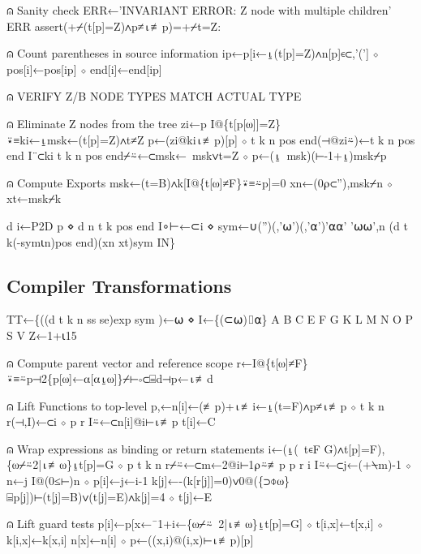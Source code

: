 \documentclass{article}%
\begin{document}
⍝ Sanity check
   ERR←'INVARIANT ERROR: Z node with multiple children'
   ERR assert(+⌿(t[p]=Z)∧p≠⍳≢p)=+⌿t=Z:

⍝ Count parentheses in source information
   ip←p[i←⍸(t[p]=Z)∧n[p]∊⊂,'('] ⋄ pos[i]←pos[ip] ⋄ end[i]←end[ip]

⍝ VERIFY Z/B NODE TYPES MATCH ACTUAL TYPE

⍝ Eliminate Z nodes from the tree
   zi←p I@\{t[p[⍵]]=Z\}⍣≡ki←⍸msk←(t[p]=Z)∧t≠Z
   p←(zi@ki⍳≢p)[p] ⋄ t k n pos end(⊣@zi⍨)←t k n pos end I¨⊂ki
   t k n pos end⌿⍨←⊂msk←~msk∨t=Z ⋄ p←(⍸~msk)(⊢-1+⍸)msk⌿p

⍝ Compute Exports
   msk←(t=B)∧k[I@\{t[⍵]≠F\}⍣≡⍨p]=0
   xn←(0⍴⊂''),msk⌿n ⋄ xt←msk⌿k

   d i←P2D p ⋄ d n t k pos end I∘⊢←⊂i ⋄ sym←∪('')(,'⍵')(,'⍺')'⍺⍺' '⍵⍵',n
   (d t k(-sym⍳n)pos end)(xn xt)sym IN\}
\nwendcode{}\nwdocspar

\subsection{Compiler Transformations}

\nwenddocs{}\endmoddef\nwstartdeflinemarkup{}\nwenddeflinemarkup
 TT←\{((d t k n ss se)exp sym )←⍵ ⋄ I←\{(⊂⍵)⌷⍺\}
   A B C E F G K L M N O P S V Z←1+⍳15

⍝ Compute parent vector and reference scope
   r←I@\{t[⍵]≠F\}⍣≡⍨p⊣2\{p[⍵]←⍺[⍺⍸⍵]\}⌿⊢∘⊂⌸d⊣p←⍳≢d

⍝ Lift Functions to top-level
   p,←n[i]←(≢p)+⍳≢i←⍸(t=F)∧p≠⍳≢p ⋄ t k n r(⊣,I)←⊂i ⋄ p r I⍨←⊂n[i]@i⊢⍳≢p
   t[i]←C

⍝ Wrap expressions as binding or return statements
   i←(⍸(~t∊F G)∧t[p]=F),\{⍵⌿⍨2|⍳≢⍵\}⍸t[p]=G ⋄ p t k n r⌿⍨←⊂m←2@i⊢1⍴⍨≢p
   p r i I⍨←⊂j←(+⍀m)-1 ⋄ n←j I@(0≤⊢)n ⋄ p[i]←j←i-1
   k[j]←-(k[r[j]]=0)∨0@(\{⊃⌽⍵\}⌸p[j])⊢(t[j]=B)∨(t[j]=E)∧k[j]=4 ⋄ t[j]←E

⍝ Lift guard tests
   p[i]←p[x←¯1+i←\{⍵⌿⍨~2|⍳≢⍵\}⍸t[p]=G] ⋄ t[i,x]←t[x,i] ⋄ k[i,x]←k[x,i]
   n[x]←n[i] ⋄ p←((x,i)@(i,x)⊢⍳≢p)[p]
\end{document}
